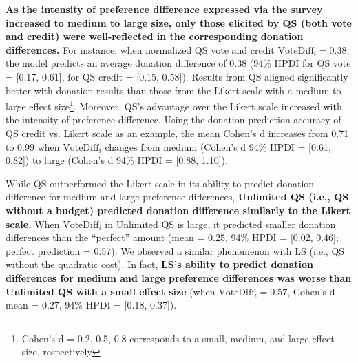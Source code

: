 \textbf{As the intensity of preference difference expressed via the survey increased to medium to large size, only those elicited by QS (both vote and credit) were well-reflected in the corresponding donation differences.} For instance, when normalized QS vote and credit $\text{VoteDiff}_i = 0.38$, the model predicts an average donation difference of 0.38 (94\% HPDI for QS vote = [0.17, 0.61], for QS credit = [0.15, 0.58]). Results from QS aligned significantly better with donation results than those from the Likert scale with a medium to large effect size\footnote{Cohen's d = 0.2, 0.5, 0.8 corresponds to a small, medium, and large effect size, respectively}. Moreover, QS's advantage over the Likert scale increased with the intensity of preference difference. Using the donation prediction accuracy of  QS credit vs. Likert scale as an example, the mean Cohen's d increases from 0.71 to 0.99 when $\text{VoteDiff}_i$ changes from medium (Cohen's d 94\% HPDI = [0.61, 0.82]) to large (Cohen's d 94\% HPDI = [0.88, 1.10]).

While QS outperformed the Likert scale in its ability to predict donation difference for medium and large preference differences, \textbf{Unlimited QS (i.e., QS without a budget) predicted donation difference similarly to the Likert scale.} When $\text{VoteDiff}_i$ in Unlimited QS is large, it predicted smaller donation differences than the ``perfect'' amount (mean = 0.25, 94\% HPDI = [0.02, 0.46]; perfect prediction = 0.57). We observed a similar phenomenon with LS (i.e., QS without the quadratic cost). In fact, \textbf{LS's ability to predict donation differences for medium and large preference differences was worse than Unlimited QS with a small effect size} (when $\text{VoteDiff}_i = 0.57$, Cohen's d mean = 0.27, 94\% HPDI = [0.18, 0.37]).